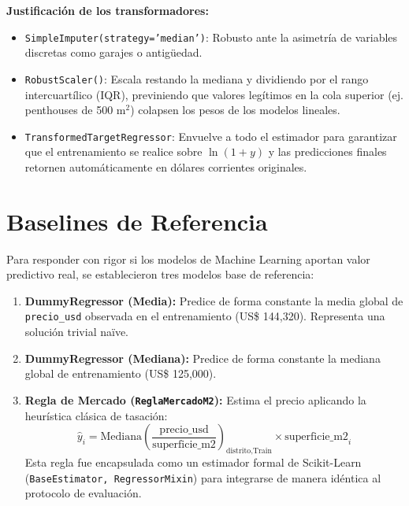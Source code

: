 \documentclass[11pt,a4paper]{article}
\begin{document}
\noindent\textbf{Justificación de los transformadores:}

\begin{itemize}[leftmargin=1.5cm]
    \item \texttt{SimpleImputer(strategy='median')}: 
    Robusto ante la asimetría de variables discretas como garajes o antigüedad.

    \item \texttt{RobustScaler()}: 
    Escala restando la mediana y dividiendo por el rango intercuartílico (IQR), 
    previniendo que valores legítimos en la cola superior 
    (ej. penthouses de 500 m$^2$) colapsen los pesos de los modelos lineales.

    \item \texttt{TransformedTargetRegressor}: 
    Envuelve a todo el estimador para garantizar que el entrenamiento se realice 
    sobre $\ln(1+y)$ y las predicciones finales retornen automáticamente 
    en dólares corrientes originales.
\end{itemize}

\section{Baselines de Referencia}

Para responder con rigor si los modelos de Machine Learning aportan valor predictivo real, se establecieron tres modelos base de referencia:
\begin{enumerate}[leftmargin=1.5cm]
    \item \textbf{DummyRegressor (Media):} Predice de forma constante la media global de \texttt{precio\_usd} observada en el entrenamiento (US\$ 144,320). Representa una solución trivial na\"ive.
    \item \textbf{DummyRegressor (Mediana):} Predice de forma constante la mediana global de entrenamiento (US\$ 125,000).
    \item \textbf{Regla de Mercado (\texttt{ReglaMercadoM2}):} Estima el precio aplicando la heurística clásica de tasación:
    \begin{equation}
        \widehat{y}_i = \text{Mediana}\left(\frac{\text{precio\_usd}}{\text{superficie\_m2}}\right)_{\text{distrito}, \text{Train}} \times \text{superficie\_m2}_i
    \end{equation}
    Esta regla fue encapsulada como un estimador formal de Scikit-Learn (\texttt{BaseEstimator, RegressorMixin}) para integrarse de manera idéntica al protocolo de evaluación.
\end{enumerate}
\end{document}
